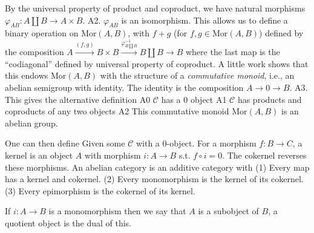 By the universal property of product and coproduct, we have natural morphisms \(\varphi_{AB}: A \coprod B \to A \times B\). A2. \(\varphi_{AB}\) is an isomorphism. 
This allows us to define a binary operation on \(\mathrm{Mor}(A, B)\), with \(f + g\) (for \(f, g \in \mathrm{Mor}(A, B)\)) defined by the composition 
\(A \xrightarrow{(f,g)} B \times B \xrightarrow{\varphi^{-1}_{B \coprod B}} B \coprod B \to B\)
where the last map is the “codiagonal” defined by universal property of coproduct. 
A little work shows that this endows \(\mathrm{Mor}(A, B)\) with the structure of a \textit{commutative monoid}, i.e., an abelian semigroup with identity. 
The identity is the composition \(A \to 0 \to B\). A3. 
This gives the alternative definition
A0 \( \mathcal{C} \) has a \( 0 \) object
A1 \( \mathcal{C} \) has products and coproducts of any two objects
A2 This commutative monoid \(\mathrm{Mor}(A, B)\) is an abelian group.

One can then define
Given some \( \mathcal{C} \) with a \( 0 \)-object. For a morphism \( f : B \to C \), a kernel is an object \( A \) with morphism \( i : A \to B \)
s.t. \( f \circ i = 0 \). The cokernel reverses these morphisms.
An abelian category is an additive category with
(1) Every map has a kernel and cokernel.
(2) Every monomorphism is the kernel of its cokernel.
(3) Every epimorphism is the cokernel of its kernel.

If \( i : A \to B \) is a monomorphism then we say that \( A \) is a subobject of \( B \),
a quotient object is the dual of this.


